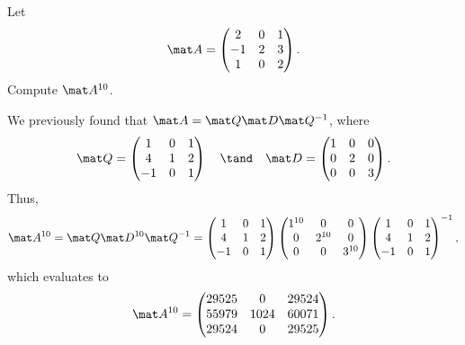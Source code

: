 \begin{sample}
    Let \[\mat A = \begin{pmatrix}2 & 0 & 1 \\ -1 & 2 & 3 \\ 1 & 0 & 2\end{pmatrix}.\] Compute $\mat A^{10}$.
\end{sample}
\begin{sampans}
    We previously found that $\mat A = \mat Q \mat D \mat Q^{-1}$, where \[\mat Q = \begin{pmatrix}1 & 0 & 1 \\ 4 & 1 & 2 \\ -1 & 0 & 1\end{pmatrix} \quad \tand \quad \mat D = \begin{pmatrix}1 & 0 & 0 \\ 0 & 2 & 0 \\ 0 & 0 & 3 \end{pmatrix}.\] Thus, \[\mat A^{10} = \mat Q \mat D^{10} \mat Q^{-1} = \begin{pmatrix}1 & 0 & 1 \\ 4 & 1 & 2 \\ -1 & 0 & 1\end{pmatrix} \begin{pmatrix}1^{10} & 0 & 0 \\ 0 & 2^{10} & 0 \\ 0 & 0 & 3^{10} \end{pmatrix} \begin{pmatrix}1 & 0 & 1 \\ 4 & 1 & 2 \\ -1 & 0 & 1\end{pmatrix}^{-1},\] which evaluates to \[\mat A^{10} = \begin{pmatrix}29525 & 0 & 29524 \\ 55979 & 1024 & 60071 \\ 29524 & 0 & 29525\end{pmatrix}.\]
\end{sampans}